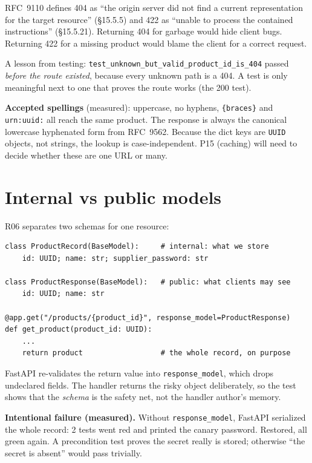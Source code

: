 \documentclass[11pt,a4paper]{article}
\newcommand{\code}[1]{\texttt{#1}}
\begin{document}
RFC~9110 defines 404 as ``the origin server did not find a current representation for
the target resource'' (\S15.5.5) and 422 as ``unable to process the contained
instructions'' (\S15.5.21). Returning 404 for garbage would hide client bugs.
Returning 422 for a missing product would blame the client for a correct request.

A lesson from testing: \code{test\_unknown\_but\_valid\_product\_id\_is\_404} passed
\emph{before the route existed}, because every unknown path is a 404. A test is only
meaningful next to one that proves the route works (the 200 test).

\textbf{Accepted spellings} (measured): uppercase, no hyphens, \code{\{braces\}} and
\code{urn:uuid:} all reach the same product. The response is always the canonical
lowercase hyphenated form from RFC~9562. Because the dict keys are \code{UUID} objects,
not strings, the lookup is case-independent. P15 (caching) will need to decide
whether these are one URL or many.

\section{Internal vs public models}

R06 separates two schemas for one resource:

\begin{Verbatim}[fontsize=\small, frame=single, framesep=2mm]
class ProductRecord(BaseModel):     # internal: what we store
    id: UUID; name: str; supplier_password: str

class ProductResponse(BaseModel):   # public: what clients may see
    id: UUID; name: str

@app.get("/products/{product_id}", response_model=ProductResponse)
def get_product(product_id: UUID):
    ...
    return product                  # the whole record, on purpose
\end{Verbatim}

FastAPI re-validates the return value into \code{response\_model}, which drops
undeclared fields. The handler returns the risky object deliberately, so the test
shows that the \emph{schema} is the safety net, not the handler author's memory.

\textbf{Intentional failure (measured).} Without \code{response\_model}, FastAPI
serialized the whole record: 2 tests went red and printed the canary password.
Restored, all green again. A precondition test proves the secret really is stored;
otherwise ``the secret is absent'' would pass trivially.
\end{document}
